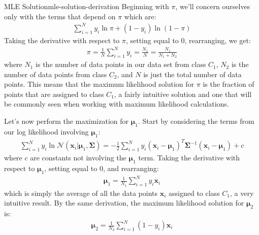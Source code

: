 \begin{derivation}{MLE Solution}{mle-solution-derivation}
    Beginning with $\pi$, we'll concern ourselves only with the terms that depend on $\pi$ which are:
    \begin{align*}
    	\sum_{i=1}^{N} y_{i}\ln{\pi} + (1-y_{i})\ln{(1 - \pi)}
    \end{align*}
    Taking the derivative with respect to $\pi$, setting equal to 0, rearranging, we get:
    \begin{align*}
    	\pi = \frac{1}{N} \sum_{i=1}^{N} y_{i} = \frac{N_{1}}{N} = \frac{N_{1}}{N_{1} + N_{2}}
    \end{align*}
    where $N_{1}$ is the number of data points in our data set from class $C_{1}$, $N_{2}$ is the number of data points from class $C_{2}$, and $N$ is just the total number of data points. This means that the maximum likelihood solution for $\pi$ is the fraction of points that are assigned to class $C_{1}$, a fairly intuitive solution and one that will be commonly seen when working with maximum likelihood calculations.

    Let's now perform the maximization for $\boldsymbol{\mu}_{1}$. Start by considering the terms from our log likelihood involving $\boldsymbol{\mu}_{1}$:
    \begin{align*}
    	\sum_{i=1}^{N} y_{i} \ln \mathcal{N}(\textbf{x}_{i} | \boldsymbol{\mu}_{1}, \boldsymbol{\Sigma}) = -\frac{1}{2} \sum_{i=1}^{N} y_{i} (\textbf{x}_{i} - \boldsymbol{\mu}_{1})^{T}\boldsymbol{\Sigma}^{-1}(\textbf{x}_{i} - \boldsymbol{\mu}_{1}) + c
    \end{align*}
    where $c$ are constants not involving the $\boldsymbol{\mu}_{1}$ term. Taking the derivative with respect to $\boldsymbol{\mu}_{1}$, setting equal to 0, and rearranging:
    \begin{align*}
    	\boldsymbol{\mu}_{1} = \frac{1}{N_{1}} \sum_{i=1}^{N} y_{i}\textbf{x}_{i}
    \end{align*}
    which is simply the average of all the data points $\textbf{x}_{i}$ assigned to class $C_{1}$, a very intuitive result. By the same derivation, the maximum likelihood solution for $\boldsymbol{\mu}_{2}$ is:
    \begin{align*}
    	\boldsymbol{\mu}_{2} = \frac{1}{N_{2}} \sum_{i=1}^{N} (1-y_{i})\textbf{x}_{i}
    \end{align*}


\end{derivation}
